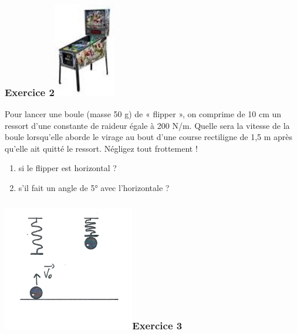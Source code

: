 \hypertarget{exercice-2}{%
\subsubsection[Exercice
2]{\texorpdfstring{\protect\hypertarget{anchor-8}{}{}Exercice
2\protect\includegraphics[width=2.688cm,height=4.12cm]{Pictures/100000000000004F00000079BF194595D71050C5.png}}{Exercice 2}}\label{exercice-2}}

Pour lancer une boule (masse 50 g) de « flipper », on comprime de 10 cm
un ressort d'une constante de raideur égale à 200 N/m. Quelle sera la
vitesse de la boule lorsqu'elle aborde le virage au bout d'une course
rectiligne de 1,5 m après qu'elle ait quitté le ressort. Négligez tout
frottement !

\begin{enumerate}
\def\labelenumi{\arabic{enumi}.}
\tightlist
\item
  si le flipper est horizontal ?
\item
  s'il fait un angle de 5° avec l'horizontale ?
\end{enumerate}

\hypertarget{exercice-3}{%
\subsubsection[Exercice
3]{\texorpdfstring{\protect\hypertarget{anchor-9}{}{}\protect\includegraphics[width=5.75cm,height=5.539cm]{Pictures/10000001000002CB000002AEBE5814C250A43575.png}Exercice
3}{Exercice 3}}\label{exercice-3}}

